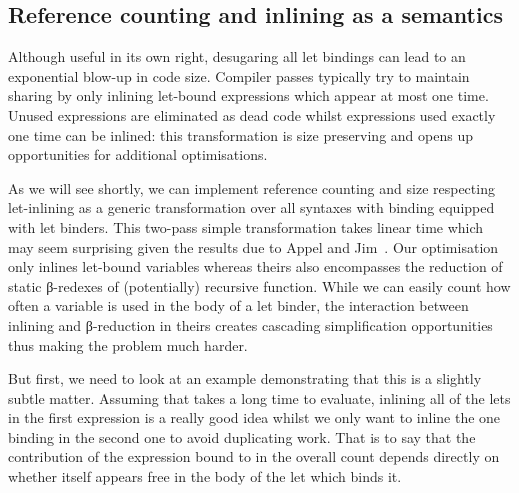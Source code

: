 \subsection{Reference counting and inlining as a semantics}\label{section:inlining}

Although useful in its own right, desugaring all let bindings can lead
to an exponential blow-up in code size. Compiler passes typically try
to maintain sharing by only inlining let-bound expressions which appear
at most one time. Unused expressions are eliminated as dead code whilst
expressions used exactly one time can be inlined: this transformation is
size preserving and opens up opportunities for additional optimisations.

As we will see shortly, we can implement reference counting and size
respecting let-inlining as a generic transformation over all syntaxes
with binding equipped with let binders. This two-pass simple transformation
takes linear time which may seem surprising given the results due to Appel and
Jim~\citeyear{DBLP:journals/jfp/AppelJ97}. Our optimisation only inlines
let-bound variables whereas theirs also encompasses the reduction of static
β-redexes of (potentially) recursive function. While we can easily count how
often a variable is used in the body of a let binder, the interaction between
inlining and β-reduction in theirs creates cascading simplification opportunities
thus making the problem much harder.

But first, we need to look at an example demonstrating that this is a
slightly subtle matter. Assuming that  takes a long time
to evaluate, inlining all of the lets in the first expression is a really
good idea whilst we only want to inline the one binding  in the
second one to avoid duplicating work. That is to say that the contribution
of the expression bound to  in the overall count depends directly
on whether  itself appears free in the body of the let which binds it.

\noindent
\begin{minipage}{\textwidth}
  \begin{minipage}{0.45\textwidth}
    \centering
  \end{minipage}
  \begin{minipage}{0.45\textwidth}
    \centering
  \end{minipage}
\end{minipage}

